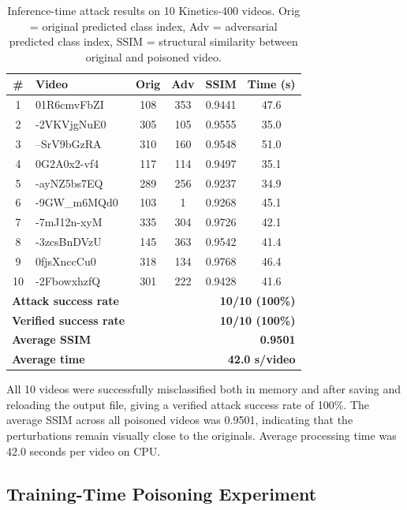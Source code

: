 \begin{table}[H]
\centering
\caption{Inference-time attack results on 10 Kinetics-400 videos.
Orig = original predicted class index,
Adv = adversarial predicted class index,
SSIM = structural similarity between original and poisoned video.}
\label{tab:benchmark}
\renewcommand{\arraystretch}{1.2}
\begin{tabular}{clcccc}
\hline
\textbf{\#} & \textbf{Video} & \textbf{Orig} & \textbf{Adv} & \textbf{SSIM} & \textbf{Time (s)} \\
\hline
1  & 01R6cmvFbZI & 108 & 353 & 0.9441 & 47.6 \\
2  & -2VKVjgNuE0 & 305 & 105 & 0.9555 & 35.0 \\
3  & --SrV9bGzRA & 310 & 160 & 0.9548 & 51.0 \\
4  & 0G2A0x2-vf4 & 117 & 114 & 0.9497 & 35.1 \\
5  & -ayNZ5bs7EQ & 289 & 256 & 0.9237 & 34.9 \\
6  & -9GW\_m6MQd0 & 103 &   1 & 0.9268 & 45.1 \\
7  & -7mJ12n-xyM & 335 & 304 & 0.9726 & 42.1 \\
8  & -3zcsBnDVzU & 145 & 363 & 0.9542 & 41.4 \\
9  & 0fjsXnccCu0 & 318 & 134 & 0.9768 & 46.4 \\
10 & -2FbowxhzfQ & 301 & 222 & 0.9428 & 41.6 \\
\hline
\multicolumn{2}{l}{\textbf{Attack success rate}} & \multicolumn{4}{r}{\textbf{10/10 (100\%)}} \\
\multicolumn{2}{l}{\textbf{Verified success rate}} & \multicolumn{4}{r}{\textbf{10/10 (100\%)}} \\
\multicolumn{2}{l}{\textbf{Average SSIM}} & \multicolumn{4}{r}{\textbf{0.9501}} \\
\multicolumn{2}{l}{\textbf{Average time}} & \multicolumn{4}{r}{\textbf{42.0 s/video}} \\
\hline
\end{tabular}
\end{table}

All 10 videos were successfully misclassified both in memory
and after saving and reloading the output file, giving a
verified attack success rate of 100\%. The average SSIM
across all poisoned videos was 0.9501, indicating that the
perturbations remain visually close to the originals.
Average processing time was 42.0 seconds per video on CPU.

\subsection{Training-Time Poisoning Experiment}
\label{subsection:training-experiment}

